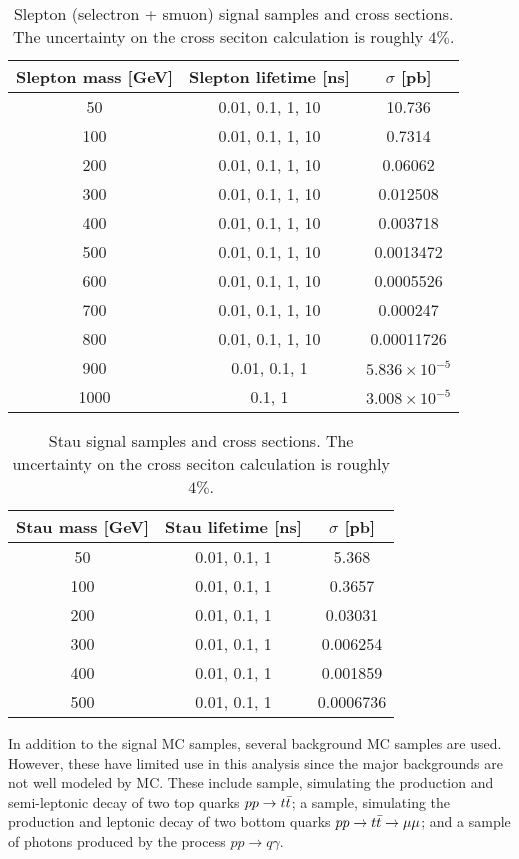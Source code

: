 \begin{table}[htb]
\begin{center}
\begin{tabular}{ccc}
 Slepton mass [GeV] & Slepton lifetime [ns] & $\sigma$ [pb] \\
 \hline
  50   &  0.01, 0.1, 1, 10   & 10.736  \\
  100  &  0.01, 0.1, 1, 10   & 0.7314  \\
  200  &  0.01, 0.1, 1, 10    & 0.06062  \\
  300  &  0.01, 0.1, 1, 10   & 0.012508  \\
  400  & 0.01, 0.1, 1, 10    & 0.003718 \\
  500  &  0.01, 0.1, 1, 10   & 0.0013472  \\
  600  &  0.01, 0.1, 1, 10   & 0.0005526\\
  700  &  0.01, 0.1, 1, 10   & 0.000247  \\
  800  & 0.01, 0.1, 1, 10   & 0.00011726 \\
 900   &  0.01, 0.1, 1      & $5.836 \times 10^{-5}$  \\
 1000  &  0.1, 1            & $3.008\times 10^{-5}$  \\
\hline
\end{tabular}
\caption{Slepton (selectron + smuon) signal samples and cross sections. The uncertainty on the cross seciton calculation is roughly $4\%$.}
\label{tab:dsid_slep}
\end{center}
\end{table}

\begin{table}[htb]
\begin{center}
\begin{tabular}{ccc}
 Stau mass [GeV] & Stau lifetime [ns] & $\sigma$ [pb] \\
 \hline
  50   &  0.01, 0.1, 1   & 5.368  \\
  100  &  0.01, 0.1, 1   & 0.3657  \\
  200  &  0.01, 0.1, 1   & 0.03031  \\
  300  &  0.01, 0.1, 1   & 0.006254  \\
  400  &  0.01, 0.1, 1   & 0.001859 \\
  500  &  0.01, 0.1, 1   & 0.0006736  \\
\hline
\end{tabular}
\caption{Stau signal samples and cross sections. The uncertainty on the cross seciton calculation is roughly $4\%$.}
\label{tab:dsid_stau}
\end{center}
\end{table}


In addition to the signal \ac{MC} samples, several background \ac{MC} samples are used. However, these have limited use in this analysis since the major backgrounds are not well modeled by \ac{MC}. These include \ttbar sample, simulating the production and semi-leptonic decay of two top quarks $pp\rightarrow t\bar{t}$; a \bbmm sample, simulating the production and leptonic decay of two bottom quarks $pp\rightarrow t\bar{t} \rightarrow \mu\mu$; and a sample of photons produced by the process $pp \rightarrow q \gamma$. 




